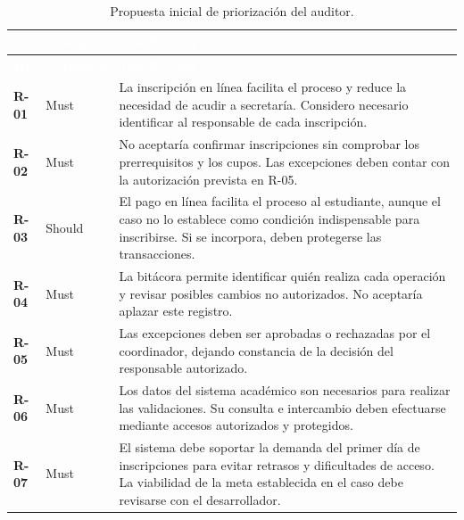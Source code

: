\documentclass[12pt,a4paper]{article}
\newcommand{\cabecera}[1]{
    \textcolor{white}{\textbf{#1}}
}
\begin{document}
\begin{longtable}{
    C{1.1cm}
    C{2cm}
    L{\dimexpr\textwidth-3.1cm-6\tabcolsep\relax}
}

\caption{Propuesta inicial de priorización del auditor.}
\label{tab:moscow-auditor}\\

\cabecera{ID} &
\cabecera{Categoría} &
\cabecera{Justificación} \\
\endfirsthead

\cabecera{ID} &
\cabecera{Categoría} &
\cabecera{Justificación} \\
\endhead

\bottomrule
\endfoot

\textbf{R-01} & Must &
La inscripción en línea facilita el proceso y reduce
la necesidad de acudir a secretaría. Considero necesario
identificar al responsable de cada inscripción. \\

\textbf{R-02} & Must &
No aceptaría confirmar inscripciones sin comprobar
los prerrequisitos y los cupos. Las excepciones deben
contar con la autorización prevista en R-05. \\

\textbf{R-03} & Should &
El pago en línea facilita el proceso al estudiante,
aunque el caso no lo establece como condición
indispensable para inscribirse. Si se incorpora,
deben protegerse las transacciones. \\

\textbf{R-04} & Must &
La bitácora permite identificar quién realiza cada
operación y revisar posibles cambios no autorizados.
No aceptaría aplazar este registro. \\

\textbf{R-05} & Must &
Las excepciones deben ser aprobadas o rechazadas por
el coordinador, dejando constancia de la decisión
del responsable autorizado. \\

\textbf{R-06} & Must &
Los datos del sistema académico son necesarios
para realizar las validaciones. Su consulta e
intercambio deben efectuarse mediante accesos
autorizados y protegidos. \\

\textbf{R-07} & Must &
El sistema debe soportar la demanda del primer día
de inscripciones para evitar retrasos y dificultades
de acceso. La viabilidad de la meta establecida
en el caso debe revisarse con el desarrollador. \\


\end{longtable}
\end{document}

